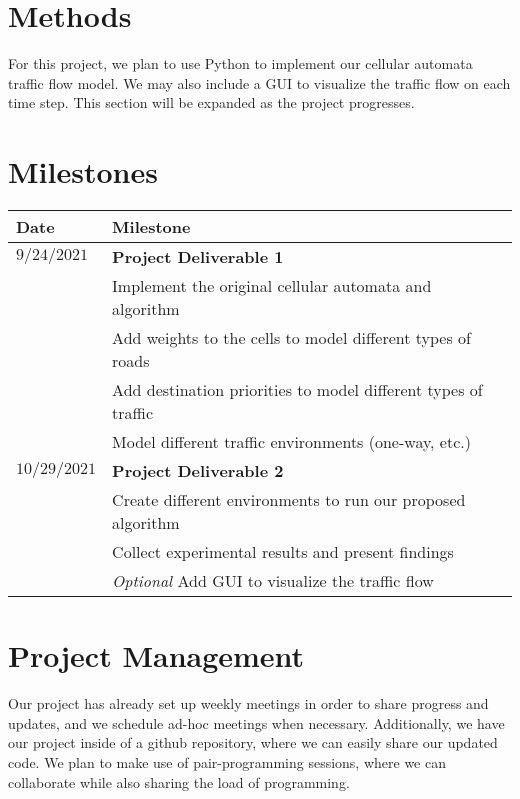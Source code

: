 \documentclass[12pt]{article}
\begin{document}
\section{Methods}
For this project, we plan to use Python to implement our cellular automata
traffic flow model. We may also include a GUI to visualize the traffic flow on
each time step. This section will be expanded as the project progresses.

\section{Milestones}

\begin{tabular}{|l|l|}
    \hline
    \textbf{Date} & \textbf{Milestone}                                             \\
    \hline
    $9/24/2021$   & \textbf{Project Deliverable 1}                                 \\
    \hline
                  & Implement the original cellular automata and algorithm         \\
    \hline
                  & Add weights to the cells to model different types of roads     \\
    \hline
                  & Add destination priorities to model different types of traffic \\
    \hline
                  & Model different traffic environments (one-way, etc.)
    \\
    \hline
    $10/29/2021$  & \textbf{Project Deliverable 2}
    \\
    \hline
                  & Create different environments to run our proposed algorithm
    \\
    \hline
                  & Collect experimental results and present findings
    \\
    \hline
                  & \textit{Optional} Add GUI to visualize the traffic flow
    \\
    \hline
\end{tabular}


\section{Project Management}
Our project has already set up weekly meetings in order to share progress and
updates, and we schedule ad-hoc meetings when necessary. Additionally, we have
our project inside of a github repository, where we can easily share our updated
code. We plan to make use of pair-programming sessions, where we can collaborate
while also sharing the load of programming.
\end{document}
